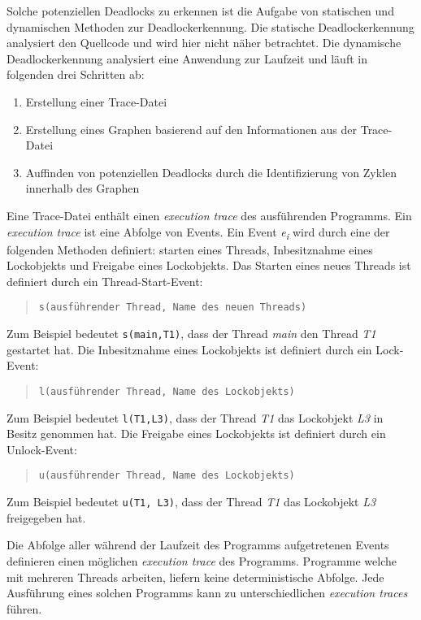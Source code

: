 Solche potenziellen Deadlocks zu erkennen ist die Aufgabe von statischen und
dynamischen Methoden zur Deadlockerkennung. Die statische Deadlockerkennung
analysiert den Quellcode und wird hier nicht näher betrachtet. Die dynamische
Deadlockerkennung analysiert eine Anwendung zur Laufzeit und läuft in folgenden
drei Schritten ab:
\begin{enumerate}
  \item Erstellung einer Trace-Datei
  \item Erstellung eines Graphen basierend auf den Informationen aus der
  Trace-Datei
  \item Auffinden von potenziellen Deadlocks durch die Identifizierung von Zyklen
  innerhalb des Graphen
\end{enumerate}

Eine Trace-Datei enthält einen \textit{execution trace}\label{text:ExecutionTrace} des ausführenden
Programms. Ein \textit{execution trace} ist eine Abfolge von Events. Ein Event
\textit{e\textsubscript{i}} wird durch eine der folgenden Methoden definiert:
starten eines Threads, Inbesitznahme eines Lockobjekts und Freigabe eines
Lockobjekts. Das Starten eines neues Threads ist definiert durch ein Thread-Start-Event:
\begin{quote}
\texttt{s(ausführender Thread, Name des neuen Threads)}
\end{quote}
Zum Beispiel bedeutet \texttt{s(main,T1)}, dass der Thread \textit{main} den Thread \textit{T1} gestartet hat. 
Die Inbesitznahme eines Lockobjekts ist definiert durch ein Lock-Event:
\begin{quote}
\texttt{l(ausführender Thread, Name des Lockobjekts)}
\end{quote}
Zum Beispiel bedeutet \texttt{l(T1,L3)}, dass der Thread \textit{T1} das Lockobjekt
\textit{L3} in Besitz genommen hat. Die Freigabe eines Lockobjekts ist definiert
durch ein Unlock-Event:
\begin{quote}
\texttt{u(ausführender Thread, Name des Lockobjekts)}
\end{quote}
Zum Beispiel bedeutet \texttt{u(T1, L3)}, dass der Thread \textit{T1} das Lockobjekt \textit{L3} freigegeben hat.

Die Abfolge aller während der Laufzeit des Programms aufgetretenen Events
definieren einen möglichen \textit{execution trace} des Programms.
Programme welche mit mehreren Threads arbeiten, liefern keine deterministische
Abfolge. Jede Ausführung eines solchen Programms kann zu
unterschiedlichen \textit{execution traces} führen. 

